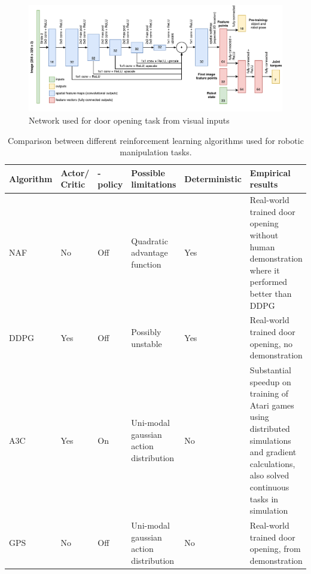 \begin{figure}[h]
    \centering
    \includegraphics[width = 1.0\textwidth]{res/gps-net.pdf}
    \caption{Network used for door opening task from visual inputs \cite{chebotar2016path}}
    \label{fig:gps_net}
\end{figure}

\begin{landscape}
    \begin{table}
        \centering
        \begin{tabular}{|l|p{1.3cm}|l|p{4cm}|l|p{6cm}|}
            \hline
            \textbf{Algorithm} & \textbf{Actor/ Critic} & \textbf{-policy} & \textbf{Possible limitations} & \textbf{Deterministic} & \textbf{Empirical results} \\
            \hline
            NAF \cite{gu2016continuous} & No & Off & Quadratic advantage function & Yes & Real-world trained door opening without human demonstration where it performed better than DDPG \\
            \hline
            DDPG \cite{lillicrap2015continuous} & Yes & Off & Possibly unstable & Yes & Real-world trained door opening, no demonstration \\
            \hline
            A3C \cite{mnih2016asynchronous} & Yes & On & Uni-modal gaussian action distribution & No & Substantial speedup on training of Atari games using distributed simulations and gradient calculations, also solved continuous tasks in simulation \\
            \hline
            GPS \cite{levine2013guided} & No & Off & Uni-modal gaussian action distribution & No & Real-world trained door opening, from demonstration \\
            \hline
        \end{tabular}

    \caption{Comparison between different reinforcement learning algorithms
    used for robotic manipulation tasks.}

    \end{table}
    \label{table:algo_comparison}

\end{landscape}

